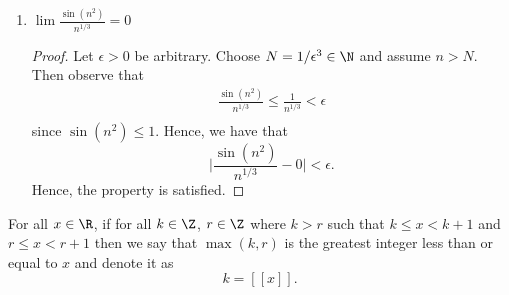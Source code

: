 \begin{enumerate}
        \begin{proof}
            Let \( \epsilon  > 0 \). Choose \( N = \min \{2,\frac{2}{ \epsilon }\} \) and suppose \( n \geq N \). Then observe that 
            \begin{align*}
               \epsilon &> \frac{2}{n} \geq \frac{2n^2}{n^3+3}.\
            \end{align*}
            Hence, we have 
            \[ \frac{2n^2}{n^3 + 3 } < \epsilon\] and our property is satisfied. 
        \end{proof}
    \item \( \lim \frac{ \sin (n^2)}{ n^{1/3} } = 0 \)

        \begin{proof}
        Let \( \epsilon > 0  \) be arbitrary. Choose \( N = 1 / \epsilon^3 \in \N \) and assume \( n > N \). Then observe that 
        \begin{align*}
            \frac{\sin (n^2)}{n^{1/3}} \leq \frac{1}{n^{1/3}} < \epsilon \\
        \end{align*}
        since \( \sin (n^2) \leq 1 \). Hence, we have that 
        \[ 
            \Big| \frac{\sin(n^2)}{n^{1/3}} - 0 \Big| < \epsilon.
        \] Hence, the property is satisfied.
        \end{proof}
\end{enumerate}

\begin{tcolorbox}
    \begin{defn}
        For all \( x \in \R \), if for all \( k \in \Z \), \( r \in \Z \) where \( k > r \)  such that \( k \leq x < k + 1 \) and \( r \leq x < r+1 \) then we say that \( \max(k,r) \) is the greatest integer less than or equal to \( x \) and denote it as 
        \[ k = [[x ]].\]
\end{defn}
\end{tcolorbox}

